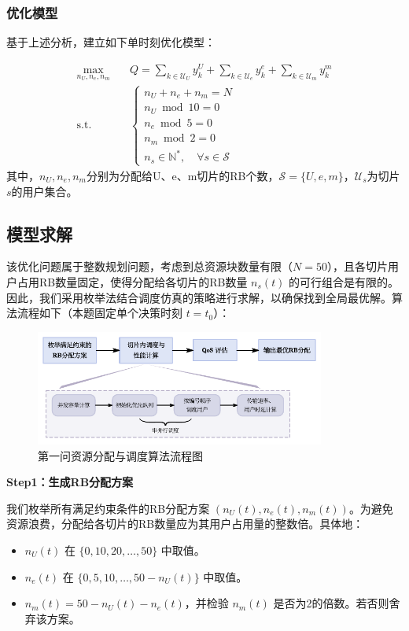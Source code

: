 \subsubsection{优化模型}

基于上述分析，建立如下单时刻优化模型：

\begin{equation}
\begin{aligned}
\max_{n_U, n_e, n_m} \quad & Q = \sum_{k \in \mathcal{U}_U} y_k^{U} + \sum_{k \in \mathcal{U}_e} y_k^{e} + \sum_{k \in \mathcal{U}_m} y_k^{m} \\
\text{s.t.} \quad & \begin{cases}
 n_U + n_e + n_m = N \\
 n_U \bmod 10 = 0 \\
 n_e \bmod 5 = 0 \\
 n_m \bmod 2 = 0 \\
 n_s \in \mathbb{N}^*, \quad \forall s \in \mathcal{S}
 \end{cases}
 \end{aligned}
 \end{equation}
其中，$n_U, n_e, n_m$分别为分配给U、e、m切片的RB个数，$\mathcal{S}=\{U,e,m\}$，$\mathcal{U}_s$为切片$s$的用户集合。
\subsection{模型求解}

该优化问题属于整数规划问题，考虑到总资源块数量有限（$N=50$），且各切片用户占用RB数量固定，使得分配给各切片的RB数量 $n_s(t)$ 的可行组合是有限的。因此，我们采用枚举法结合调度仿真的策略进行求解，以确保找到全局最优解。算法流程如下（本题固定单个决策时刻 $t=t_0$）：
\begin{figure}[H]
    \centering
    \includegraphics[width=0.85\textwidth]{figures/第一问算法.pdf}
    \caption{第一问资源分配与调度算法流程图}
    \label{fig:q1_algorithm_flow}
\end{figure}

\textbf{Step1：生成RB分配方案}

我们枚举所有满足约束条件的RB分配方案 $(n_U(t), n_e(t), n_m(t))$。为避免资源浪费，分配给各切片的RB数量应为其用户占用量的整数倍。具体地：
\begin{itemize}
    \item $n_U(t)$ 在 $\{0, 10, 20, \dots, 50\}$ 中取值。
    \item $n_e(t)$ 在 $\{0, 5, 10, \dots, 50 - n_U(t)\}$ 中取值。
    \item $n_m(t) = 50 - n_U(t) - n_e(t)$，并检验 $n_m(t)$ 是否为2的倍数。若否则舍弃该方案。
\end{itemize}

